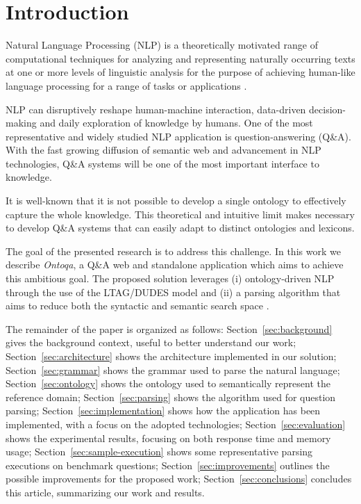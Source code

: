 \section{Introduction}
\label{sec:introduction}

Natural Language Processing (NLP) is a theoretically motivated range of
computational techniques for analyzing and representing naturally occurring texts
at one or more levels of linguistic analysis for the purpose of achieving human-like
language processing for a range of tasks or applications \cite{liddy2001natural}.

NLP can disruptively reshape human-machine interaction, data-driven decision-making and daily exploration of knowledge by humans.
%
One of the most representative and widely studied NLP application is question-answering (Q\&A).
%
With the fast growing diffusion of semantic web and advancement in NLP technologies, Q\&A systems will be one of the most important interface to knowledge.

It is well-known that it is not possible to develop a single ontology to effectively capture the whole knowledge.
%
This theoretical and intuitive limit makes necessary to develop Q\&A systems that can easily adapt to distinct ontologies and lexicons.

The goal of the presented research is to address this  challenge.
%
In this work we describe \textit{Ontoqa}, a Q\&A web and standalone application which aims to achieve this ambitious goal.
%
The proposed solution leverages (i) ontology-driven NLP through the use of the LTAG/DUDES model and (ii) a parsing algorithm that aims to reduce both the syntactic and  semantic search space \cite{cimiano2014ontology}.


The remainder of the paper is organized as follows:
Section~\ref{sec:background} gives the background context, useful to better understand our work;
Section~\ref{sec:architecture} shows the architecture implemented in our solution;
Section~\ref{sec:grammar} shows the grammar used to parse the natural language;
Section~\ref{sec:ontology} shows the ontology used to semantically represent the reference domain;
Section~\ref{sec:parsing} shows the algorithm used for question parsing;
Section~\ref{sec:implementation} shows how the application has been implemented, with a focus on the adopted technologies;
Section~\ref{sec:evaluation} shows the experimental results, focusing on both response time and memory usage;
Section~\ref{sec:sample-execution} shows some representative parsing executions on benchmark questions;
Section~\ref{sec:improvements} outlines the possible improvements for the proposed work;
Section~\ref{sec:conclusions} concludes this article, summarizing our work and results.